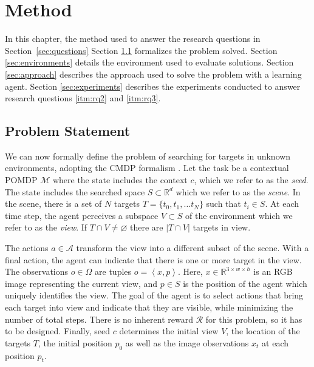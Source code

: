 \chapter{Method}
\label{cha:method}

In this chapter, the method used to answer the research questions in Section~\ref{sec:questions}
Section \ref{sec:problem} formalizes the problem solved.
Section \ref{sec:environments} details the environment used to evaluate solutions.
Section \ref{sec:approach} describes the approach used to solve the problem with a learning agent.
Section \ref{sec:experiments} describes the experiments conducted to answer research questions \ref{itm:rq2} and \ref{itm:rq3}.

\section{Problem Statement}
\label{sec:problem}

We can now formally define the problem of searching for targets in unknown environments,
adopting the CMDP formalism \cite{kirk_survey_2022}.
Let the task be a contextual POMDP \(\mathcal{M}\) where the state includes the context \(c\), which we refer to as the \textit{seed}.
The state includes the searched space \(S \subset \mathbb{R}^d\) which we refer to as the \textit{scene}.
In the scene, there is a set of \(N\) targets \(T = \{t_0, t_1, \dots t_N\}\) such that \(t_i \in S\).
At each time step, the agent perceives a subspace \(V \subset S\) of the environment which we refer to as the \textit{view}.
If \(T \cap V \neq \varnothing\) there are \(\left\lvert T \cap V \right\rvert\) targets in view.

The actions \(a \in \mathcal{A}\) transform the view into a different subset of the scene.
With a final action, the agent can indicate that there is one or more target in the view.
The observations \(o \in \Omega\) are tuples \(o = \left\langle x, p \right\rangle\).
Here, \(x \in \mathbb{R}^{3 \times w \times h}\) is an RGB image representing the current view, and \(p \in S\) is the position of the agent which uniquely identifies the view.
The goal of the agent is to select actions that bring each target into view and indicate that they are visible, while minimizing the number of total steps.
There is no inherent reward \(\mathcal{R}\) for this problem, so it has to be designed.
Finally, seed \(c\) determines the initial view \(V\), the location of the targets \(T\), the initial position \(p_0\) as well as the image observations \(x_t\) at each position \(p_t\).

